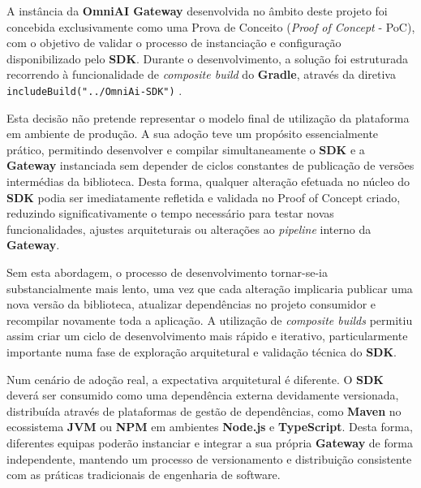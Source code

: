     A instância da \textbf{OmniAI Gateway} desenvolvida no âmbito deste projeto foi concebida exclusivamente como uma Prova de Conceito (\textit{Proof of Concept} - PoC), com o objetivo de validar o processo de instanciação e configuração disponibilizado pelo \textbf{SDK}.
    Durante o desenvolvimento, a solução foi estruturada recorrendo à funcionalidade de \textit{composite build} do \textbf{Gradle}, através da diretiva \texttt{includeBuild("../OmniAi-SDK")} \cite{gradle_composite_builds}.

    Esta decisão não pretende representar o modelo final de utilização da plataforma em ambiente de produção. A sua adoção teve um propósito essencialmente prático, permitindo desenvolver e compilar simultaneamente o \textbf{SDK} e a \textbf{Gateway} instanciada sem depender de ciclos constantes de publicação de versões intermédias da biblioteca. Desta forma, qualquer alteração efetuada no núcleo do \textbf{SDK} podia ser imediatamente refletida e validada no Proof of Concept criado, reduzindo significativamente o tempo necessário para testar novas funcionalidades, ajustes arquiteturais ou alterações ao \textit{pipeline} interno da \textbf{Gateway}.

    Sem esta abordagem, o processo de desenvolvimento tornar-se-ia substancialmente mais lento, uma vez que cada alteração implicaria publicar uma nova versão da biblioteca, atualizar dependências no projeto consumidor e recompilar novamente toda a aplicação. A utilização de \textit{composite builds} permitiu assim criar um ciclo de desenvolvimento mais rápido e iterativo, particularmente importante numa fase de exploração arquitetural e validação técnica do \textbf{SDK}.

    Num cenário de adoção real, a expectativa arquitetural é diferente. O \textbf{SDK} deverá ser consumido como uma dependência externa devidamente versionada, distribuída através de plataformas de gestão de dependências, como \textbf{Maven} no ecossistema \textbf{JVM} ou \textbf{NPM} em ambientes \textbf{Node.js} e \textbf{TypeScript}. Desta forma, diferentes equipas poderão instanciar e integrar a sua própria \textbf{Gateway} de forma independente, mantendo um processo de versionamento e distribuição consistente com as práticas tradicionais de engenharia de software.
